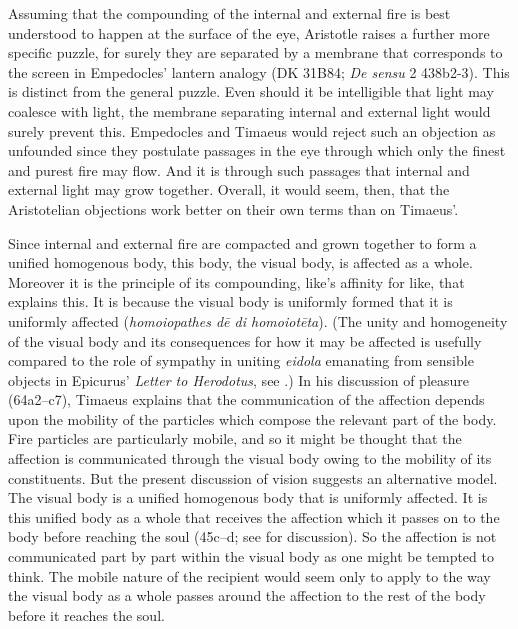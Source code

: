 Assuming that the compounding of the internal and external fire is best understood to happen at the surface of the eye, Aristotle raises a further more specific puzzle, for surely they are separated by a membrane that corresponds to the screen in Empedocles' lantern analogy (DK 31B84; \emph{De sensu} 2 438b2-3). This is distinct from the general puzzle. Even should it be intelligible that light may coalesce with light, the membrane separating internal and external light would surely prevent this. Empedocles and Timaeus would reject such an objection as unfounded since they postulate passages in the eye through which only the finest and purest fire may flow. And it is through such passages that internal and external light may grow together. Overall, it would seem, then, that the Aristotelian objections work better on their own terms than on Timaeus'.

Since internal and external fire are compacted and grown together to form a unified homogenous body, this body, the visual body, is affected as a whole. Moreover it is the principle of its compounding, like's affinity for like, that explains this. It is because the visual body is uniformly formed that it is uniformly affected (\emph{homoiopathes dē di homoiotēta}). (The unity and homogeneity of the visual body and its consequences for how it may be affected is usefully compared to the role of sympathy in uniting \emph{eidola} emanating from sensible objects in Epicurus' \emph{Letter to Herodotus}, see \citealt{Lee:1978yz}.) In his discussion of pleasure (64a2--c7), Timaeus explains that the communication of the affection depends upon the mobility of the particles which compose the relevant part of the body. Fire particles are particularly mobile, and so it might be thought that the affection is communicated through the visual body owing to the mobility of its constituents. But the present discussion of vision suggests an alternative model. The visual body is a unified homogenous body that is uniformly affected. It is this unified body as a whole that receives the affection which it passes on to the body before reaching the soul (45c--d; see \citealt[72, 92 n46]{Hahm:1978ny} for discussion). So the affection is not communicated part by part within the visual body as one might be tempted to think. The mobile nature of the recipient would seem only to apply to the way the visual body as a whole passes around the affection to the rest of the body before it reaches the soul.

